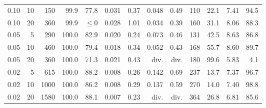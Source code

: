 \begin{table}[htbp]
\begin{adjustbox}{max width=\textwidth}
\begin{tabular}{rr rrrrr rr rrrr}
        0.10 & 10 & 150 & 99.9 & 77.8 & 0.031 & 0.37 & 0.048 & 0.49 & 110 & 22.1 & 7.41 & 94.5 \\
        0.10 & 20 & 360 & 99.9 & $\leq 0$ & 0.028 & 1.01 & 0.034 & 0.39 & 160 & 31.1 & 8.06 & 88.3 \\ \midrule
        0.05 & 5 & 290 & 100.0 & 82.9 & 0.020 & 0.24 & 0.073 & 0.46 & 131 & 42.5 & 8.63 & 86.8 \\
        0.05 & 10 & 460 & 100.0 & 79.4 & 0.018 & 0.34 & 0.052 & 0.43 & 168 & 55.7 & 8.60 & 89.7 \\
        0.05 & 20 & 360 & 100.0 & 71.3 & 0.021 & 0.43 & div. & div. & 180 & 99.6 & 5.83 & 4.1 \\ \midrule
        0.02 & 5 & 615 & 100.0 & 88.2 & 0.008 & 0.26 & 0.142 & 0.69 & 237 & 13.7 & 7.37 & 96.7 \\
        0.02 & 10 & 1000 & 100.0 & 86.2 & 0.008 & 0.29 & 0.137 & 0.59 & 270 & 14.0 & 7.40 & 98.8 \\
        0.02 & 20 & 1580 & 100.0 & 88.1 & 0.007 & 0.23 & div. & div. & 364 & 26.8 & 6.81 & 85.6 \\
        \bottomrule
    \end{tabular}
    \end{adjustbox}
\end{table}
